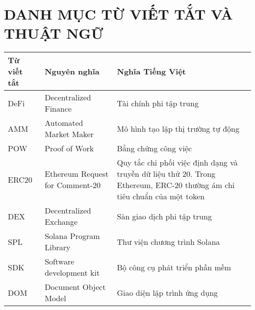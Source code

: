 \chapter*{DANH MỤC TỪ VIẾT TẮT VÀ THUẬT NGỮ}

\begin{longtable}{|>{\raggedright\arraybackslash}p{3cm}|>{\raggedright\arraybackslash}p{5cm}|>{\raggedright\arraybackslash}p{5cm}|}
  \hline
  \textbf{Từ viết tắt}   &
  \textbf{Nguyên nghĩa}  &
  \textbf{Nghĩa Tiếng Việt}                                                                        \\
  \hline
  DeFi                   &
  Decentralized Finance  &
  Tài chính phi tập trung
  \\
  \hline
  AMM                    & Automated Market
  Maker                  & Mô hình tạo lập thị trường tự động

  \\
  \hline
  POW                    & Proof of Work
                         & Bằng chứng công việc
  \\
  \hline
  ERC20                  & Ethereum
  Request for Comment-20 & Quy tắc chi phối việc định dạng và truyền dữ liệu
  thứ 20.  Trong Ethereum, ERC-20 thường ám chỉ tiêu chuẩn của một token
  \\
  \hline

  DEX                    & Decentralized Exchange
                         & Sàn giao dịch phi tập trung

  \\
  \hline

  SPL                    & Solana Program
  Library                & Thư viện chương trình Solana
  \\
  \hline

  SDK                    & Software development kit
                         & Bộ công cụ phát triển phần mềm

  \\
  \hline

  DOM                    & Document Object Model                            & Giao diện lập trình
  ứng dụng
  \\
  \hline
\end{longtable}